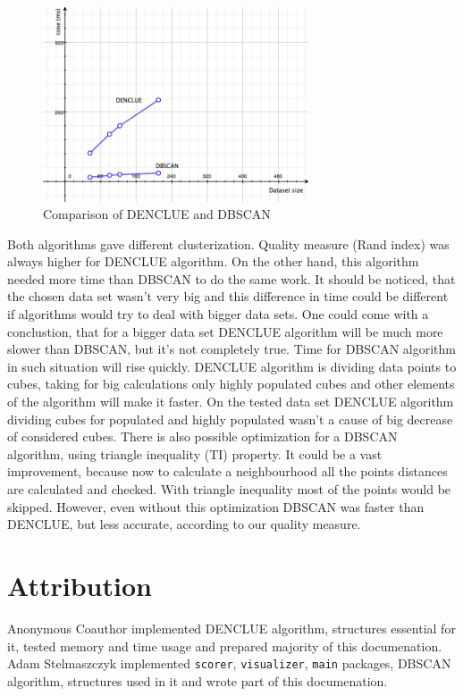 \documentclass[12pt, a4paper, notitlepage, oneside]{article}
\begin{document}
\begin{figure}[!ht]
 	\centering
	\includegraphics[width=0.7\textwidth]{images/comparison_time.png}
 	\caption[]
	{Comparison of DENCLUE and DBSCAN}
		\label{comparison_time}
\end{figure}

Both algorithms gave different clusterization.
Quality measure (Rand index) was always higher for DENCLUE algorithm.
On the other hand, this algorithm needed more time than DBSCAN to do the same work. 
It should be noticed, that the chosen data set wasn't very big and this difference in time could be different if 
algorithms would try to deal with bigger data sets. 
One could come with a conclustion, that for a bigger data set DENCLUE algorithm will be much more slower 
than DBSCAN, but it's not completely true. 
Time for DBSCAN algorithm in such situation will rise quickly. 
DENCLUE algorithm is dividing data points to cubes, taking for big calculations only highly populated cubes and other elements of the algorithm will make it faster.
On the tested data set DENCLUE algorithm dividing cubes for populated and 
highly populated wasn't a cause of big decrease of considered cubes.
There is also possible optimization for a DBSCAN algorithm, using triangle inequality (TI) property. \cite{mkr}
It could be a vast improvement, because now to calculate a neighbourhood all the points distances are calculated and checked.
With triangle inequality most of the points would be skipped. However, even without this optimization DBSCAN was faster
than DENCLUE, but less accurate, according to our quality measure.

\section{Attribution}

Anonymous Coauthor implemented DENCLUE algorithm, structures essential for it, 
tested memory and time usage and prepared majority of this documenation.
Adam Stelmaszczyk implemented \texttt{scorer}, \texttt{visualizer}, \texttt{main} packages, 
DBSCAN algorithm, structures used in it and wrote part of this documenation.

\newpage



\end{document}
